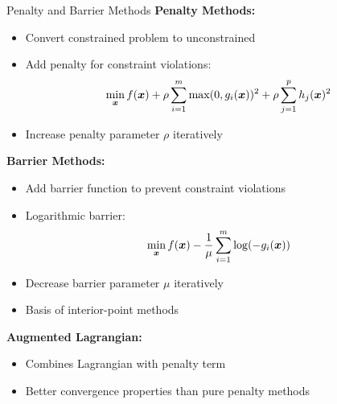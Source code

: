\documentclass[aspectratio=169]{beamer}
\begin{document}
\begin{frame}{Penalty and Barrier Methods}
  \textbf{Penalty Methods:}
  \begin{itemize}
    \item Convert constrained problem to unconstrained
    \item Add penalty for constraint violations:
    $$\min_{\boldsymbol{x}} f(\boldsymbol{x}) + \rho \sum_{i=1}^m \max(0, g_i(\boldsymbol{x}))^2 + \rho \sum_{j=1}^p h_j(\boldsymbol{x})^2$$
    \item Increase penalty parameter $\rho$ iteratively
  \end{itemize}

  \vspace{0.5em}

  \textbf{Barrier Methods:}
  \begin{itemize}
    \item Add barrier function to prevent constraint violations
    \item Logarithmic barrier:
    $$\min_{\boldsymbol{x}} f(\boldsymbol{x}) - \frac{1}{\mu} \sum_{i=1}^m \log(-g_i(\boldsymbol{x}))$$
    \item Decrease barrier parameter $\mu$ iteratively
    \item Basis of interior-point methods
  \end{itemize}

  \vspace{0.5em}

  \textbf{Augmented Lagrangian:}
  \begin{itemize}
    \item Combines Lagrangian with penalty term
    \item Better convergence properties than pure penalty methods
  \end{itemize}
\end{frame}
\end{document}
